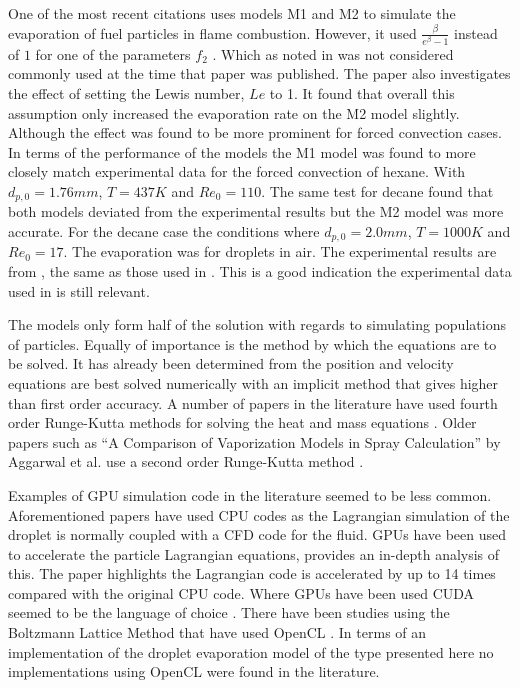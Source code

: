 \documentclass[../Interim_Report_Master]{subfiles}
\begin{document}
One of the most recent citations uses models M1 and M2 to simulate the evaporation of fuel particles in flame combustion. However, it used $\frac{\beta}{e^{\beta}-1}$ instead of $1$ for one of the parameters $f_2$ \cite{SacomanoFilho2019}. Which as noted in \cite{Miller1998} was not considered commonly used at the time that paper was published. The paper also investigates the effect of setting the Lewis number, $Le$ to 1. It found that overall this assumption only increased the evaporation rate on the M2 model slightly. Although the effect was found to be more prominent for forced convection cases. In terms of the performance of the models the M1 model was found to more closely match experimental data for the forced convection of hexane. With $d_{p,0}=1.76mm$, $T=437K$ and $Re_0=110$. The same test for decane found that both models deviated from the experimental results but the M2 model was more accurate. For the decane case the conditions where $d_{p,0}=2.0mm$, $T=1000K$ and $Re_0=17$. The evaporation was for droplets in air. The experimental results are from \cite{Downing1966}, the same as those used in \cite{Miller1998}. This is a good indication the experimental data used in \cite{Miller1998} is still relevant.


The models only form half of the solution with regards to simulating populations of particles. Equally of importance is the method by which the equations are to be solved. It has already been determined from \cite{Elijah_GPU_Report} the position and velocity equations are best solved numerically with an implicit method that gives higher than first order accuracy. A number of papers in the literature have used fourth order Runge-Kutta methods for solving the heat and mass equations \cite{Miller1998} \cite{salman2004} \cite{Kolaitis2006}. Older papers such as ``A Comparison of Vaporization Models in Spray Calculation'' by Aggarwal et al. use a second order Runge-Kutta method \cite{Aggarwal1984}. 


Examples of GPU simulation code in the literature seemed to be less common. Aforementioned papers have used CPU codes as the Lagrangian simulation of the droplet is normally coupled with a CFD code for the fluid. GPUs have been used to accelerate the particle Lagrangian equations, \cite{sweet2017} provides an in-depth analysis of this. The paper highlights the Lagrangian code is accelerated by up to 14 times compared with the original CPU code. Where GPUs have been used CUDA seemed to be the language of choice \cite{sweet2017} \cite{Zhang2018}. There have been studies using the Boltzmann Lattice Method that have used OpenCL \cite{Obrecht2015} \cite{verdier2020}. In terms of an implementation of the droplet evaporation model of the type presented here no implementations using OpenCL were found in the literature.
\end{document}

